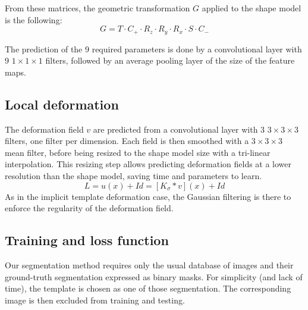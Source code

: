 From these matrices, the geometric transformation $G$ applied to the shape model is the following:
\begin{equation}
    G = T \cdot C_+ \cdot R_z \cdot R_y \cdot R_x \cdot S \cdot C_-
\end{equation}

The prediction of the 9 required parameters is done by a convolutional layer with 9 $1 \times 1 \times 1$ filters, followed by an average pooling layer of the size of the feature maps. 

\subsection{Local deformation}
\label{ssec:seg_local}

The deformation field $v$ are predicted from a convolutional layer with 3 $3 \times 3 \times 3$ filters, one filter per dimension. Each field is then smoothed with a $3 \times 3 \times 3$ mean filter, before being resized to the shape model size with a tri-linear interpolation. This resizing step allows predicting deformation fields at a lower resolution than the shape model, saving time and parameters to learn.
\begin{equation}
    L = u(x) + Id = [K_{\sigma} * v](x) + Id
\end{equation}
As in the implicit template deformation case, the Gaussian filtering is there to enforce the regularity of the deformation field.


\subsection{Training and loss function}
\label{ssec:seg_training}

Our segmentation method requires only the usual database of images and their ground-truth segmentation expressed as binary masks. For simplicity (and lack of time), the template is chosen as one of those segmentation. The corresponding image is then excluded from training and testing. 


